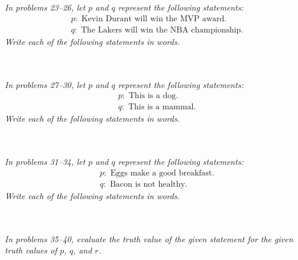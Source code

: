 \begin{exercises}

\\ \\

\emph{In problems 23--26, let $p$ and $q$ represent the following statements:}
\begin{align*}
&p: \textrm{ Kevin Durant will win the MVP award.}\\
&q: \textrm{ The Lakers will win the NBA championship.}
\end{align*}
\emph{Write each of the following statements in words.}

\\ \\

\emph{In problems 27--30, let $p$ and $q$ represent the following statements:}
\begin{align*}
&p: \textrm{ This is a dog.}\\
&q: \textrm{ This is a mammal.}
\end{align*}
\emph{Write each of the following statements in words.}

\\ \\

\emph{In problems 31--34, let $p$ and $q$ represent the following statements:}
\begin{align*}
&p: \textrm{ Eggs make a good breakfast.}\\
&q: \textrm{ Bacon is not healthy.}
\end{align*}
\emph{Write each of the following statements in words.}

\\ \\

\emph{In problems 35--40, evaluate the truth value of the given statement for the given truth values of $p$, $q$, and $r$.}


\end{exercises}
